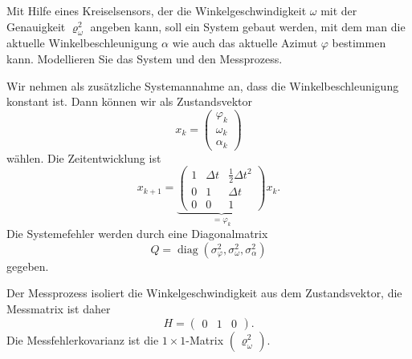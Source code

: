 Mit Hilfe eines Kreiselsensors, der die Winkelgeschwindigkeit $\omega$
mit der Genauigkeit $\varrho_{\omega}^2$ angeben kann, soll ein System gebaut
werden, mit dem man die aktuelle Winkelbeschleunigung $\alpha$ wie auch
das aktuelle Azimut $\varphi$ bestimmen kann.
Modellieren Sie das System und den Messprozess.


\begin{loesung}
Wir nehmen als zusätzliche Systemannahme an, dass die Winkelbeschleunigung
konstant ist.
Dann können wir als Zustandsvektor
\[
x_k=\begin{pmatrix}\varphi_k\\\omega_k\\\alpha_k\end{pmatrix}
\]
wählen.
Die Zeitentwicklung ist
\[
x_{k+1}=\underbrace{\begin{pmatrix}
1&\Delta t&\frac12\Delta t^2\\
0&1       &\Delta t\\
0&0       &1
\end{pmatrix}}_{=\varphi_k}x_k.
\]
Die Systemefehler werden durch eine Diagonalmatrix
\[
Q=\operatorname{diag}(\sigma_{\varphi}^2, \sigma_{\omega}^2, \sigma_{\alpha}^2)
\]
gegeben.

Der Messprozess isoliert die Winkelgeschwindigkeit aus dem Zustandsvektor,
die Messmatrix ist daher
\[
H=\begin{pmatrix}
0&1&0
\end{pmatrix}.
\]
Die Messfehlerkovarianz ist die $1\times 1$-Matrix
$\begin{pmatrix}\varrho_\omega^2\end{pmatrix}$.
\end{loesung}


